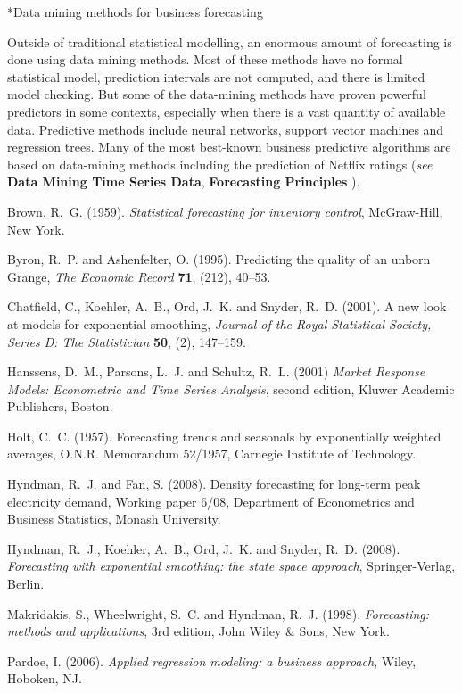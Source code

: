 \documentclass[10pt]{article}
\makeatletter
\renewcommand{\subsection}%
{\@startsection{subsection}{1}{0mm}{\baselineskip}{0.5\baselineskip}{\normalfont\rmfamily\bfseries}}
\makeatother
\begin{document}
\subsection*{Data mining methods for business forecasting}

Outside of traditional statistical modelling, an enormous amount of forecasting is done using data mining methods. Most of these methods have no formal statistical model, prediction intervals are not computed, and there is limited model checking. But some of the data-mining methods have proven powerful predictors in some contexts, especially when there is a vast quantity of available data. Predictive methods include neural networks, support vector machines and regression trees. Many of the most best-known business predictive algorithms are based on data-mining methods including the prediction of Netflix ratings (\textit{see} \textbf{Data Mining Time Series Data}, \textbf{Forecasting Principles}
).

\begin{thebibliography}{xx}

Brown, R.~G.  (1959). {\em Statistical
  forecasting for inventory control}, McGraw-Hill, New York.

Byron, R.~P. and Ashenfelter, O.  (1995). Predicting the quality of an unborn {Grange}, {\em
  The Economic Record} {\bf 71}, (212), 40--53.

Chatfield, C., Koehler, A.~B., Ord, J.~K. and Snyder, R.~D.
  (2001). A new look at models for
  exponential smoothing, {\em Journal of the Royal Statistical Society, Series
  D: The Statistician} {\bf 50}, (2), 147--159.

Hanssens, D.~M., Parsons, L.~J. and Schultz, R.~L.  (2001) {\em Market Response Models: Econometric and Time
  Series Analysis}, second edition, Kluwer Academic Publishers, Boston.

Holt, C.~C.  (1957). Forecasting trends and
  seasonals by exponentially weighted averages, O.N.R. Memorandum 52/1957,
  Carnegie Institute of Technology.

Hyndman, R.~J. and Fan, S.  (2008).
  Density forecasting for long-term peak electricity demand, Working paper
  6/08, Department of Econometrics and Business Statistics, Monash University.

Hyndman, R.~J., Koehler, A.~B., Ord, J.~K. and Snyder, R.~D.
  (2008). {\em Forecasting with exponential
  smoothing: the state space approach}, Springer-Verlag, Berlin.

Makridakis, S., Wheelwright, S.~C. and Hyndman, R.~J.
  (1998). {\em Forecasting: methods and
  applications}, 3rd edition, John Wiley \& Sons, New York.

Pardoe, I.  (2006). {\em Applied regression
  modeling: a business approach}, Wiley, Hoboken, NJ.

\end{thebibliography}
\end{document}
